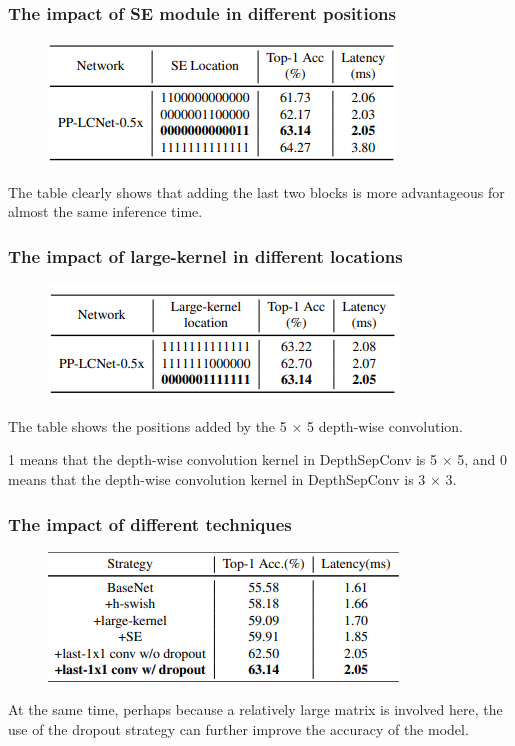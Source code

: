\documentclass[11pt]{article}
\begin{document}
\subsubsection{The impact of SE module in different positions}

\begin{figure}[h]
	\centering
	\includegraphics[scale = 0.5]{6}
\end{figure}
The table clearly shows that adding the last two blocks is more advantageous for almost the same inference time.
\subsubsection{The impact of large-kernel in different locations}

\begin{figure}[h]
	\centering
	\includegraphics[scale = 0.5]{7}
\end{figure}
The table shows the positions added by the 5 $\times$ 5 depth-wise convolution.

1 means that the depth-wise convolution kernel in DepthSepConv is 5 $\times$ 5, and 0 means
that the depth-wise convolution kernel in DepthSepConv is 3 $\times$ 3.
\subsubsection{The impact of different techniques}

\begin{figure}[h]
	\centering
	\includegraphics[scale = 0.5]{8}
\end{figure}
At the same time, perhaps because a relatively large matrix is involved here, the use of the dropout strategy can further improve the accuracy of the model.
\end{document}
